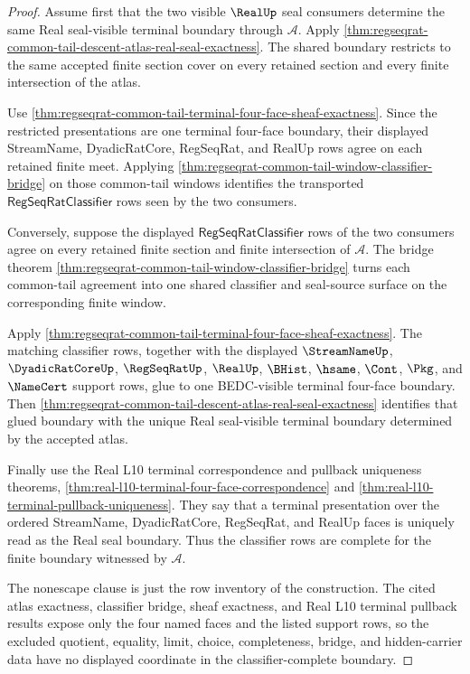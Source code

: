\begin{proof}
Assume first that the two visible $\RealUp$ seal consumers determine the same Real seal-visible terminal boundary through $\mathcal A$. Apply \autoref{thm:regseqrat-common-tail-descent-atlas-real-seal-exactness}. The shared boundary restricts to the same accepted finite section cover on every retained section and every finite intersection of the atlas.

Use \autoref{thm:regseqrat-common-tail-terminal-four-face-sheaf-exactness}. Since the restricted presentations are one terminal four-face boundary, their displayed StreamName, DyadicRatCore, RegSeqRat, and RealUp rows agree on each retained finite meet. Applying \autoref{thm:regseqrat-common-tail-window-classifier-bridge} on those common-tail windows identifies the transported $\mathsf{RegSeqRatClassifier}$ rows seen by the two consumers.

Conversely, suppose the displayed $\mathsf{RegSeqRatClassifier}$ rows of the two consumers agree on every retained finite section and finite intersection of $\mathcal A$. The bridge theorem \autoref{thm:regseqrat-common-tail-window-classifier-bridge} turns each common-tail agreement into one shared classifier and seal-source surface on the corresponding finite window.

Apply \autoref{thm:regseqrat-common-tail-terminal-four-face-sheaf-exactness}. The matching classifier rows, together with the displayed $\StreamNameUp$, $\DyadicRatCoreUp$, $\RegSeqRatUp$, $\RealUp$, $\BHist$, $\hsame$, $\Cont$, $\Pkg$, and $\NameCert$ support rows, glue to one BEDC-visible terminal four-face boundary. Then \autoref{thm:regseqrat-common-tail-descent-atlas-real-seal-exactness} identifies that glued boundary with the unique Real seal-visible terminal boundary determined by the accepted atlas.

Finally use the Real L10 terminal correspondence and pullback uniqueness theorems, \autoref{thm:real-l10-terminal-four-face-correspondence} and \autoref{thm:real-l10-terminal-pullback-uniqueness}. They say that a terminal presentation over the ordered StreamName, DyadicRatCore, RegSeqRat, and RealUp faces is uniquely read as the Real seal boundary. Thus the classifier rows are complete for the finite boundary witnessed by $\mathcal A$.

The nonescape clause is just the row inventory of the construction. The cited atlas exactness, classifier bridge, sheaf exactness, and Real L10 terminal pullback results expose only the four named faces and the listed support rows, so the excluded quotient, equality, limit, choice, completeness, bridge, and hidden-carrier data have no displayed coordinate in the classifier-complete boundary.
\end{proof}

